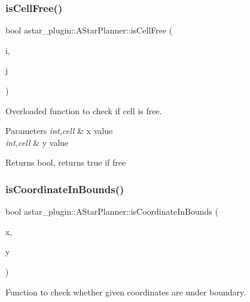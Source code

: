 \subsubsection{\texorpdfstring{is\+Cell\+Free()}{isCellFree()}\hspace{0.1cm}{\footnotesize\ttfamily [2/2]}}
{\footnotesize\ttfamily bool astar\+\_\+plugin\+::\+A\+Star\+Planner\+::is\+Cell\+Free (\begin{DoxyParamCaption}\item[{int}]{i,  }\item[{int}]{j }\end{DoxyParamCaption})}



Overloaded function to check if cell is free. 


\begin{DoxyParams}{Parameters}
{\em int,cell} & x value \\
\hline
{\em int,cell} & y value \\
\hline
\end{DoxyParams}
\begin{DoxyReturn}{Returns}
bool, returns true if free 
\end{DoxyReturn}
\mbox{\label{classastar__plugin_1_1_a_star_planner_a3e3717511d9000f1c55f3f57a58dfd0f}} 
\subsubsection{\texorpdfstring{is\+Coordinate\+In\+Bounds()}{isCoordinateInBounds()}}
{\footnotesize\ttfamily bool astar\+\_\+plugin\+::\+A\+Star\+Planner\+::is\+Coordinate\+In\+Bounds (\begin{DoxyParamCaption}\item[{float}]{x,  }\item[{float}]{y }\end{DoxyParamCaption})}



Function to check whether given coordinates are under boundary. 


